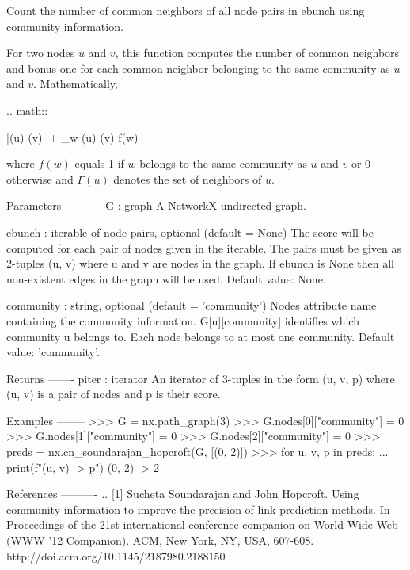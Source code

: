 \begin{DoxyVerb}Count the number of common neighbors of all node pairs in ebunch
    using community information.

For two nodes $u$ and $v$, this function computes the number of
common neighbors and bonus one for each common neighbor belonging to
the same community as $u$ and $v$. Mathematically,

.. math::

    |\Gamma(u) \cap \Gamma(v)| + \sum_{w \in \Gamma(u) \cap \Gamma(v)} f(w)

where $f(w)$ equals 1 if $w$ belongs to the same community as $u$
and $v$ or 0 otherwise and $\Gamma(u)$ denotes the set of
neighbors of $u$.

Parameters
----------
G : graph
    A NetworkX undirected graph.

ebunch : iterable of node pairs, optional (default = None)
    The score will be computed for each pair of nodes given in the
    iterable. The pairs must be given as 2-tuples (u, v) where u
    and v are nodes in the graph. If ebunch is None then all
    non-existent edges in the graph will be used.
    Default value: None.

community : string, optional (default = 'community')
    Nodes attribute name containing the community information.
    G[u][community] identifies which community u belongs to. Each
    node belongs to at most one community. Default value: 'community'.

Returns
-------
piter : iterator
    An iterator of 3-tuples in the form (u, v, p) where (u, v) is a
    pair of nodes and p is their score.

Examples
--------
>>> G = nx.path_graph(3)
>>> G.nodes[0]["community"] = 0
>>> G.nodes[1]["community"] = 0
>>> G.nodes[2]["community"] = 0
>>> preds = nx.cn_soundarajan_hopcroft(G, [(0, 2)])
>>> for u, v, p in preds:
...     print(f"({u}, {v}) -> {p}")
(0, 2) -> 2

References
----------
.. [1] Sucheta Soundarajan and John Hopcroft.
   Using community information to improve the precision of link
   prediction methods.
   In Proceedings of the 21st international conference companion on
   World Wide Web (WWW '12 Companion). ACM, New York, NY, USA, 607-608.
   http://doi.acm.org/10.1145/2187980.2188150
\end{DoxyVerb}
 \mbox{\label{namespacenetworkx_1_1algorithms_1_1link__prediction_a45713a94d1120e276cad7a7e636b7212}} 
